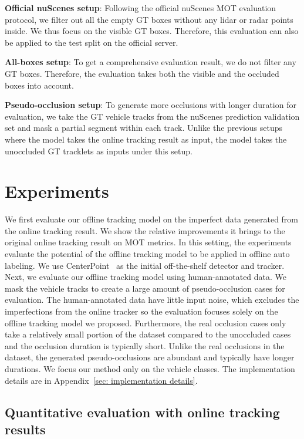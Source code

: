 \documentclass{article} \usepackage{iclr2023_conference,times}
\begin{document}
\textbf{Official nuScenes setup}: Following the official nuScenes MOT evaluation protocol, we filter out all the empty GT boxes without any lidar or radar points inside. We thus focus on the visible GT boxes. Therefore, this evaluation can also be applied to the test split on the official server.

\textbf{All-boxes setup}: To get a comprehensive evaluation result, we do not filter any GT boxes. Therefore, the evaluation takes both the visible and the occluded boxes into account.

\textbf{Pseudo-occlusion setup}: To generate more occlusions with longer duration for evaluation, we take the GT vehicle tracks from the nuScenes prediction validation set and mask a partial segment within each track. Unlike the previous setups where the model takes the online tracking result as input, the model takes the unoccluded GT tracklets as inputs under this setup. 

\section{Experiments}
\vspace{-1mm}
We first evaluate our offline tracking model on the imperfect data generated from the online tracking result. We show the relative improvements it brings to the original online tracking result on MOT metrics. In this setting, the experiments evaluate the potential of the offline tracking model to be applied in offline auto labeling. We use CenterPoint~\cite{Centerpoint} as the initial off-the-shelf detector and tracker. Next, we evaluate our offline tracking model using human-annotated data. We mask the vehicle tracks to create a large amount of pseudo-occlusion cases for evaluation. The human-annotated data have little input noise, which excludes the imperfections from the online tracker so the evaluation focuses solely on the offline tracking model we proposed. Furthermore, the real occlusion cases only take a relatively small portion of the dataset compared to the unoccluded cases and the occlusion duration is typically short. Unlike the real occlusions in the dataset, the generated pseudo-occlusions are abundant and typically have longer durations. We focus our method only on the vehicle classes. The implementation details are in Appendix~\ref{sec: implementation details}.
\vspace{-1mm}
\subsection{Quantitative evaluation with online tracking results}
\label{sec: online tracking eval}
\vspace{-1mm}
\end{document}
